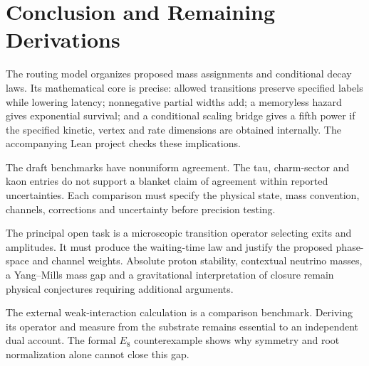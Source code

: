 \section{Conclusion and Remaining Derivations}
The routing model organizes proposed mass assignments and conditional decay laws. Its mathematical core is precise: allowed transitions preserve specified labels while lowering latency; nonnegative partial widths add; a memoryless hazard gives exponential survival; and a conditional scaling bridge gives a fifth power if the specified kinetic, vertex and rate dimensions are obtained internally. The accompanying Lean project checks these implications.

The draft benchmarks have nonuniform agreement. The tau, charm-sector and kaon entries do not support a blanket claim of agreement within reported uncertainties. Each comparison must specify the physical state, mass convention, channels, corrections and uncertainty before precision testing.

The principal open task is a microscopic transition operator selecting exits and amplitudes. It must produce the waiting-time law and justify the proposed phase-space and channel weights. Absolute proton stability, contextual neutrino masses, a Yang--Mills mass gap and a gravitational interpretation of closure remain physical conjectures requiring additional arguments.

The external weak-interaction calculation is a comparison benchmark. Deriving its operator and measure from the substrate remains essential to an independent dual account. The formal $E_8$ counterexample shows why symmetry and root normalization alone cannot close this gap.
